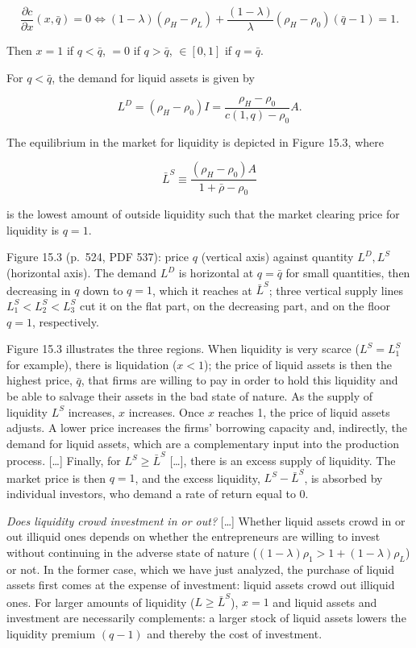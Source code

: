 \documentclass[11pt,a4paper]{article}
\begin{document}
\[\frac{\partial c}{\partial x}(x, \bar q) = 0 \iff (1 - \lambda)(\rho_H - \rho_L) + \frac{(1 - \lambda)}{\lambda}(\rho_H - \rho_0)(\bar q - 1) = 1.\]

Then \(x = 1\) if \(q < \bar q\), \(= 0\) if \(q > \bar q\), \(\in [0, 1]\) if \(q = \bar q\).

For \(q < \bar q\), the demand for liquid assets is given by

\[L^D = (\rho_H - \rho_0)I = \frac{\rho_H - \rho_0}{c(1, q) - \rho_0}A.\]

The equilibrium in the market for liquidity is depicted in Figure 15.3, where

\[\bar L^S \equiv \frac{(\rho_H - \rho_0)A}{1 + \bar\rho - \rho_0}\]

is the lowest amount of outside liquidity such that the market clearing price for liquidity is
\(q = 1\).

Figure 15.3 (p.~524, PDF 537): price \(q\) (vertical axis) against quantity \(L^D, L^S\) (horizontal
axis). The demand \(L^D\) is horizontal at \(q = \bar q\) for small quantities, then decreasing in
\(q\) down to \(q = 1\), which it reaches at \(\bar L^S\); three vertical supply lines
\(L_1^S < L_2^S < L_3^S\) cut it on the flat part, on the decreasing part, and on the floor
\(q = 1\), respectively.

Figure 15.3 illustrates the three regions. When liquidity is very scarce (\(L^S = L_1^S\) for
example), there is liquidation (\(x < 1\)); the price of liquid assets is then the highest price,
\(\bar q\), that firms are willing to pay in order to hold this liquidity and be able to salvage
their assets in the bad state of nature. As the supply of liquidity \(L^S\) increases, \(x\)
increases. Once \(x\) reaches 1, the price of liquid assets adjusts. A lower price increases the
firms' borrowing capacity and, indirectly, the demand for liquid assets, which are a complementary
input into the production process. {[}\ldots{]} Finally, for \(L^S \geqslant \bar L^S\)
{[}\ldots{]}, there is an excess supply of liquidity. The market price is then \(q = 1\), and the
excess liquidity, \(L^S - \bar L^S\), is absorbed by individual investors, who demand a rate of
return equal to 0.

\emph{Does liquidity crowd investment in or out?} {[}\ldots{]} Whether liquid assets crowd in or out
illiquid ones depends on whether the entrepreneurs are willing to invest without continuing in the
adverse state of nature (\((1 - \lambda)\rho_1 > 1 + (1 - \lambda)\rho_L\)) or not. In the former
case, which we have just analyzed, the purchase of liquid assets first comes at the expense of
investment: liquid assets crowd out illiquid ones. For larger amounts of liquidity
(\(L \geqslant \bar L^S\)), \(x = 1\) and liquid assets and investment are necessarily complements:
a larger stock of liquid assets lowers the liquidity premium \((q - 1)\) and thereby the cost of
investment.
\end{document}
